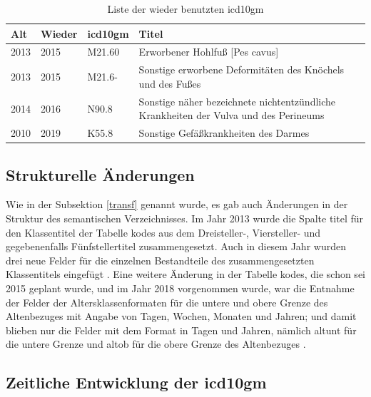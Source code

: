 \begin{table}[ht]
	\centering
	\small
	\caption[Wieder benutzte \acs{icd10gm}]{Liste der wieder benutzten \ac{icd10gm}}
	\label{tab:wieder}
	\begin{tabular}{|l|l|l|p{6cm}|}
		\hline
		\rowcolor{lightgray} Alt & Wieder & \ac{icd10gm} & Titel \\ \hline
		2013 & 2015 & M21.60 & Erworbener Hohlfuß [Pes cavus] \\ \hline
		2013 & 2015 & M21.6- & Sonstige erworbene Deformitäten des Knöchels und des Fußes \\ \hline
		2014 & 2016 & N90.8 & Sonstige näher bezeichnete nichtentzündliche Krankheiten der Vulva und des Perineums \\ \hline
		2010 & 2019 & K55.8 & Sonstige Gefäßkrankheiten des Darmes \\ \hline

\end{tabular}
\end{table}

\subsection{Strukturelle Änderungen}

Wie in der Subsektion \ref{transf} genannt wurde, es gab auch Änderungen in der Struktur des semantischen Verzeichnisses. Im Jahr 2013 wurde die Spalte \textsf{titel} für den Klassentitel der Tabelle \textsf{kodes} aus dem Dreisteller-, Viersteller- und gegebenenfalls Fünfstellertitel zusammengesetzt. Auch in diesem Jahr wurden drei neue Felder für die einzelnen Bestandteile des zusammengesetzten Klassentitels eingefügt \cite{readme13}. Eine weitere Änderung in der Tabelle \textsf{kodes}, die schon sei 2015 geplant wurde, und im Jahr 2018 vorgenommen wurde, war die Entnahme der Felder der Altersklassenformaten für die untere und obere Grenze des Altenbezuges mit Angabe von Tagen, Wochen, Monaten und Jahren; und damit blieben nur die Felder mit dem Format in Tagen und Jahren, nämlich  \textsf{altunt} für die untere Grenze und \textsf{altob} für die obere Grenze des Altenbezuges \cite{readme17}.

\subsection{Zeitliche Entwicklung der \ac{icd10gm}}

